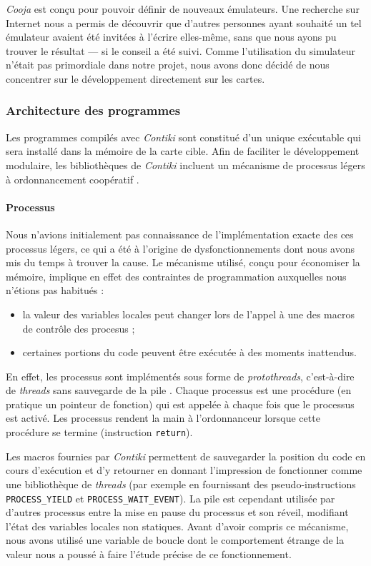 
\emph{Cooja} est conçu pour pouvoir définir de nouveaux émulateurs.
Une recherche sur Internet nous a permis de découvrir que d’autres personnes ayant souhaité un tel émulateur avaient été invitées à l’écrire elles-même, sans que nous ayons pu trouver le résultat — si le conseil a été suivi.
Comme l’utilisation du simulateur n’était pas primordiale dans notre projet, nous avons donc décidé de nous concentrer sur le développement directement sur les cartes.

\subsubsection{Architecture des programmes}

Les programmes compilés avec \emph{Contiki} sont constitué d’un unique exécutable qui sera installé dans la mémoire de la carte cible.
Afin de faciliter le développement modulaire, les bibliothèques de \emph{Contiki} incluent un mécanisme de processus légers à ordonnancement coopératif .

\paragraph{Processus}

Nous n’avions initialement pas connaissance de l’implémentation exacte des ces processus légers, ce qui a été à l’origine de dysfonctionnements dont nous avons mis du temps à trouver la cause.
Le mécanisme utilisé, conçu pour économiser la mémoire, implique en effet des contraintes de programmation auxquelles nous n’étions pas habitués :
\begin{itemize}
	\item la valeur des variables locales peut changer lors de l’appel à une des macros de contrôle des procesus ;
	\item certaines portions du code peuvent être exécutée à des moments inattendus.
\end{itemize}

En effet, les processus sont implémentés sous forme de \emph{protothreads}, c’est-à-dire de \emph{threads} sans sauvegarde de la pile .
Chaque processus est une procédure (en pratique un pointeur de fonction) qui est appelée à chaque fois que le processus est activé.
Les processus rendent la main à l’ordonnanceur lorsque cette procédure se termine (instruction \texttt{return}).

Les macros fournies par \emph{Contiki} permettent de sauvegarder la position du code en cours d’exécution et d’y retourner en donnant l’impression de fonctionner comme une bibliothèque de \emph{threads} (par exemple en fournissant des pseudo-instructions \texttt{PROCESS\_YIELD} et \texttt{PROCESS\_WAIT\_EVENT}).
La pile est cependant utilisée par d’autres processus entre la mise en pause du processus et son réveil, modifiant l’état des variables locales non statiques.
Avant d’avoir compris ce mécanisme, nous avons utilisé une variable de boucle dont le comportement étrange de la valeur nous a poussé à faire l’étude précise de ce fonctionnement.
\label{variables-locales}

